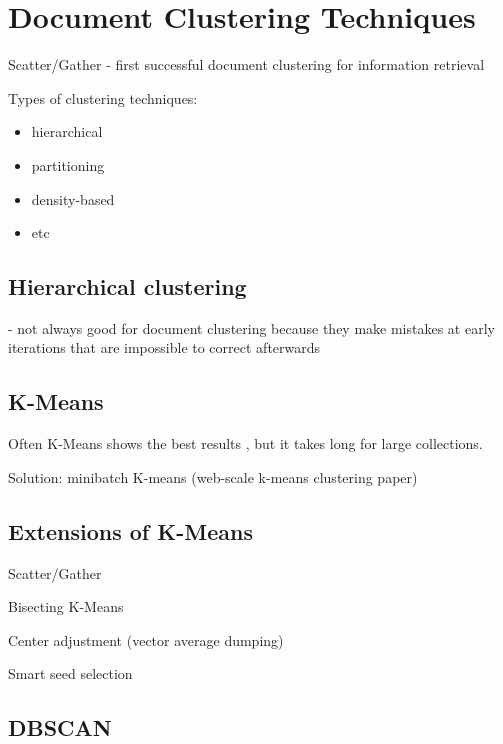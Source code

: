 \section{Document Clustering Techniques}

Scatter/Gather - first successful document clustering for information retrieval \cite{cutting1992scatter}


Types of clustering techniques:
\begin{itemize}
  \item hierarchical 
  \item partitioning
  \item density-based
  \item etc
\end{itemize}


\subsection{Hierarchical clustering}


\cite{steinbach2000comparison} - not always good for document clustering 
because they make mistakes at early iterations that are impossible 
to correct afterwards


\subsection{K-Means}


Often K-Means shows the best results \cite{hall2012evaluating} \cite{steinbach2000comparison}, but it takes long for large collections.

Solution: minibatch K-means (web-scale k-means clustering paper) \cite{sculley2010web}



\subsection{Extensions of K-Means}

Scatter/Gather \cite{cutting1992scatter} 

Bisecting K-Means \cite{steinbach2000comparison} 

Center adjustment (vector average dumping) \cite{larsen1999fast}

Smart seed selection \cite{cutting1992scatter} \cite{larsen1999fast}



\subsection{DBSCAN}

